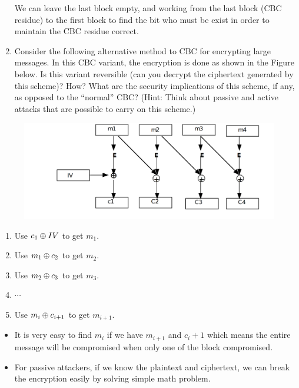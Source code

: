 \documentclass[11pt]{article}
\begin{document}
\begin{enumerate}
We can leave the last block empty, and working from the last block (CBC residue) to the first block to find the bit who must be exist in order to maintain the CBC residue correct.

\item Consider the following alternative method to CBC for encrypting large messages. In this CBC variant, the encryption is done as shown in the Figure below. Is this variant reversible (can you decrypt the ciphertext generated by this scheme)? How? What are the security implications of this scheme, if any, as opposed to the ``normal'' CBC? (Hint: Think about passive and active attacks that are possible to carry on this scheme.)
\end{enumerate}

\begin{figure}[h!]
\includegraphics[width=6in]{cbc_variant.png}
\centering
\end{figure}

\begin{enumerate}
  \item Use $c_{1}\oplus IV$ to get $m_{1}$.
  \item Use $m_{1}\oplus c_{2}$ to get $m_{2}$.
  \item Use $m_{2}\oplus c_{3}$ to get $m_{3}$.
  \item $\cdots$
  \item Use $m_{i}\oplus c_{i+1}$ to get $m_{i+1}$.
\end{enumerate}

\begin{itemize}
  \item It is very easy to find $m_{i}$ if we have $m_{i+1}$ and $c_{i}+1$ which means the entire message will be compromised when only one of the block compromised.
  \item For passive attackers, if we know the plaintext and ciphertext, we can break the encryption easily by solving simple math problem.
\end{itemize}
\end{document}
